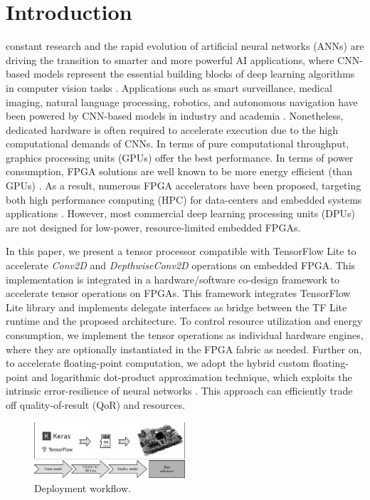 
\section{Introduction}
\label{sec:introduction}
 constant research and the rapid evolution of artificial neural networks (ANNs) are driving the transition to smarter and more powerful AI applications, where CNN-based models represent the essential building blocks of deep learning algorithms in computer vision tasks \cite{hassaballah2020deep}. Applications such as smart surveillance, medical imaging, natural language processing, robotics, and autonomous navigation have been powered by CNN-based models in industry and academia \cite{dhillon2020convolutional}. Nonetheless, dedicated hardware is often required to accelerate execution due to the high computational demands of CNNs. In terms of pure computational throughput, graphics processing units (GPUs) offer the best performance. In terms of power consumption, FPGA solutions are well known to be more energy efficient (than GPUs) \cite{nurvitadhi2017can}. As a result, numerous FPGA accelerators have been proposed, targeting both high performance computing (HPC) for data-centers and embedded systems applications \cite{abdelouahab2018accelerating, moini2017resource, guo2017angel}. However, most commercial deep learning processing units (DPUs) are not designed for low-power, resource-limited embedded FPGAs.

In this paper, we present a tensor processor compatible with TensorFlow Lite to accelerate \emph{Conv2D} and \emph{DepthwiseConv2D} operations on embedded FPGA. This implementation is integrated in a hardware/software co-design framework to accelerate tensor operations on FPGAs. This framework integrates TensorFlow Lite library and implements delegate interfaces\cite{TensorFlowDelegate} as bridge between the TF Lite runtime and the proposed architecture. To control resource utilization and energy consumption, we implement the tensor operations as individual hardware engines, where they are optionally instantiated in the FPGA fabric as needed. Further on, to accelerate floating-point computation, we adopt the hybrid custom floating-point and logarithmic dot-product approximation technique\cite{nevarez2021accelerating}, which exploits the intrinsic error-resilience of neural networks \cite{venkataramani2015approximate}. This approach can efficiently trade off quality-of-result (QoR) and resources.

\begin{figure}[t!]
	\centering
	\includegraphics[width=0.5\textwidth]{../figures/workflow.pdf}
	\caption{Deployment workflow.}
	\label{fig:workflow}
\end{figure}


